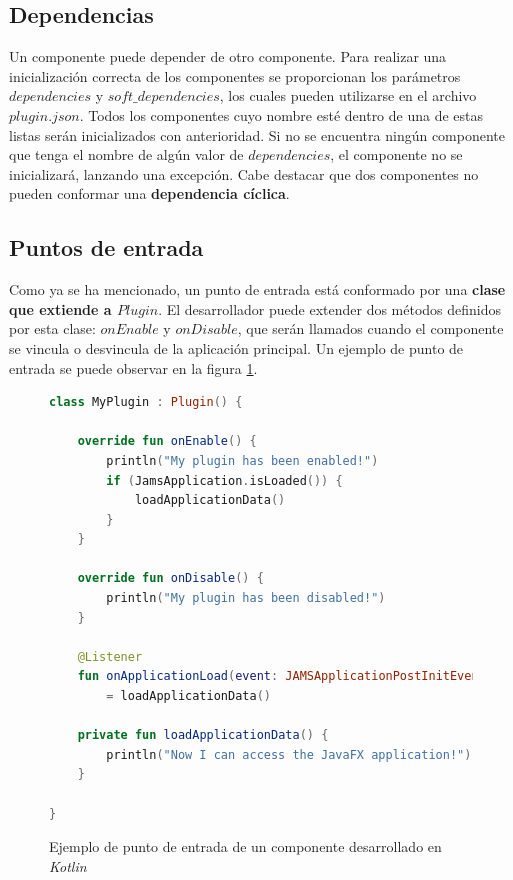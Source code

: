 \subsection{Dependencias}\label{subsec:dependencias}

Un componente puede depender de otro componente.
Para realizar una inicialización correcta de los componentes
se proporcionan los parámetros $dependencies$
y $soft\_dependencies$, los cuales pueden utilizarse en
el archivo $plugin.json$.
Todos los componentes cuyo nombre esté dentro de una de estas
listas serán inicializados con anterioridad.
Si no se encuentra ningún componente que tenga el nombre
de algún valor de $dependencies$, el componente no
se inicializará, lanzando una excepción.
Cabe destacar que dos componentes no pueden conformar
una \textbf{dependencia cíclica}.

\subsection{Puntos de entrada}\label{subsec:puntos-de-entrada}

Como ya se ha mencionado, un punto de entrada está conformado
por una \textbf{clase que extiende a $Plugin$}.
El desarrollador puede extender dos métodos definidos por esta clase:
$onEnable$ y $onDisable$, que serán llamados cuando el
componente se vincula o desvincula de la aplicación principal.
Un ejemplo de punto de entrada se puede observar en la figura \ref{fig:entry-point}.

\begin{figure}[h]
    \centering
    \begin{lstlisting}[frame=single,label={lst:entry-point},language=Kotlin]
class MyPlugin : Plugin() {

    override fun onEnable() {
        println("My plugin has been enabled!")
        if (JamsApplication.isLoaded()) {
            loadApplicationData()
        }
    }

    override fun onDisable() {
        println("My plugin has been disabled!")
    }

    @Listener
    fun onApplicationLoad(event: JAMSApplicationPostInitEvent)
        = loadApplicationData()

    private fun loadApplicationData() {
        println("Now I can access the JavaFX application!")
    }

}
    \end{lstlisting}
    \caption{Ejemplo de punto de entrada de un componente desarrollado en \textit{Kotlin}}
    \label{fig:entry-point}
\end{figure}

